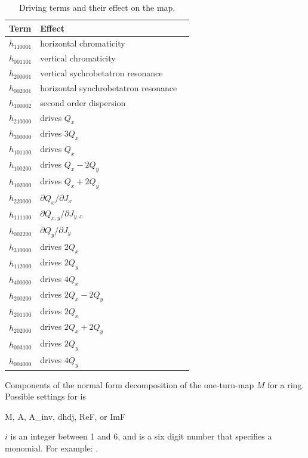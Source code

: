 \begin{description}
{{{{{{\begin{table}[htb]
\centering
\begin{tabular}{lll}
  \toprule
  Term  & Effect \\
  \midrule
  $h_{110001}$  &  horizontal chromaticity \\
  $h_{001101}$  &  vertical chromaticity   \\
  $h_{200001}$  &  vertical sychrobetatron resonance    \\
  $h_{002001}$  &  horizontal synchrobetatron resonance \\
  $h_{100002}$  &  second order dispersion \\
  $h_{210000}$  &  drives $Q_x$            \\
  $h_{300000}$  &  drives $3Q_x$           \\
  $h_{101100}$  &  drives $Q_x$            \\
  $h_{100200}$  &  drives $Q_x-2Q_y$       \\
  $h_{102000}$  &  drives $Q_x+2Q_y$       \\
  $h_{220000}$  &  $\partial Q_x/\partial J_x$ \\
  $h_{111100}$  &  $\partial Q_{x,y}/\partial J_{y,x}$ \\
  $h_{002200}$  &  $\partial Q_y/\partial J_y$ \\
  $h_{310000}$  &  drives $2Q_x$  \\
  $h_{112000}$  &  drives $2Q_y$  \\
  $h_{400000}$  &  drives $4Q_x$  \\
  $h_{200200}$  &  drives $2Q_x-2Q_y$ \\
  $h_{201100}$  &  drives $2Q_x$ \\
  $h_{202000}$  &  drives $2Q_x+2Q_y$ \\
  $h_{003100}$  &  drives $2Q_y$ \\
  $h_{004000}$  &  drives $4Q_y$ \\
  \bottomrule
\end{tabular}
\caption[Common Driving Terms.]
{Driving terms and their effect on the map.}
\label{t:dts}
\end{table}

  \item[normal.<type>.$i$.<monomial>] \Newline {}
Components of the normal form decomposition of the one-turn-map $M$ for a ring. 
Possible settings for  is
\begin{example}
  M, A, A_inv, dhdj, ReF, or ImF
\end{example}      
$i$ is an integer between 1 and 6, and  is a six digit number that specifies
a monomial. For example: . 

}}}}}}
\end{description}
